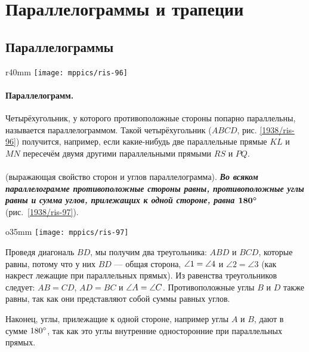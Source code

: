 \section{Параллелограммы и трапеции}

\subsection*{Параллелограммы}

{

\begin{wrapfigure}{r}{40mm}
\vskip-7mm
\centering
\texttt{[image: mppics/ris-96]}
\caption{}\label{1938/ris-96}
\end{wrapfigure}

\paragraph{Параллелограмм.}\label{1938/87}
Четырёхугольник, у которого противоположные стороны попарно параллельны, называется параллелограммом.
Такой четырёхугольник ($ABCD$, рис. \ref{1938/ris-96}) получится, например, если какие-нибудь две параллельные прямые $KL$ и $MN$ пересечём двумя другими параллельными прямыми $RS$ и $PQ$.

}

\paragraph{}\label{1938/88}
\mbox{} (выражающая свойство сторон и углов параллелограмма).
\textbf{\emph{Во всяком параллелограмме противоположные стороны равны, противоположные углы равны и сумма углов, прилежащих к одной стороне, равна $\bm{180\degree}$}} (рис.~\ref{1938/ris-97}).

\begin{wrapfigure}{o}{35mm}
\centering
\texttt{[image: mppics/ris-97]}
\caption{}\label{1938/ris-97}
\end{wrapfigure}

Проведя диагональ $BD$, мы получим два треугольника:
$ABD$ и $BCD$, которые равны, потому что у них $BD$ — общая сторона, $\angle 1 \z= \angle 4$ и $\angle 2 = \angle 3$ (как накрест лежащие при параллельных прямых).
Из равенства треугольников следует:
$AB=CD$, $AD=BC$ и $\angle A \z= \angle C$.
Противоположные углы $B$ и $D$ также равны, так как они представляют собой суммы равных углов.

Наконец, углы, прилежащие к одной стороне, например углы $A$ и $B$, дают в сумме $180\degree$, так как это углы внутренние односторонние при параллельных прямых.

